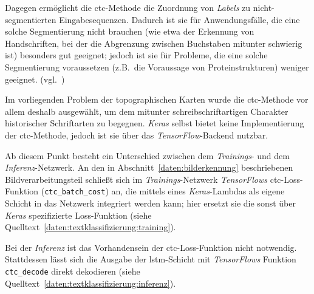 Dagegen ermöglicht die \gls{ctc}-Methode die Zuordnung von \textit{Labels} zu nicht-segmentierten Eingabesequenzen.
Dadurch ist sie für Anwendungsfälle, die eine solche Segmentierung nicht brauchen (wie etwa der Erkennung von
Handschriften, bei der die Abgrenzung zwischen Buchstaben mitunter schwierig ist) besonders gut geeignet; jedoch ist sie
für Probleme, die eine solche Segmentierung voraussetzen (z.B.\ die Voraussage von Proteinstrukturen) weniger geeignet.
(vgl.~\cite{graves2006})

Im vorliegenden Problem der topographischen Karten wurde die \gls{ctc}-Methode vor allem deshalb ausgewählt, um dem
mitunter schreibschriftartigen Charakter historischer Schriftarten zu begegnen. \textit{Keras} selbst bietet keine
Implementierung der \gls{ctc}-Methode, jedoch ist sie über das \textit{TensorFlow}-Backend nutzbar.

Ab diesem Punkt besteht ein Unterschied zwischen dem \textit{Trainings}- und dem \textit{Inferenz}-Netzwerk. An den
in Abschnitt~\ref{daten:bilderkennung} beschriebenen Bildverarbeitungsteil schließt sich im \textit{Trainings}-Netzwerk
\textit{TensorFlows} \gls{ctc}-Loss-Funktion (\texttt{ctc\_batch\_cost}) an, die mittels eines \textit{Keras}-Lambdas
als eigene Schicht in das Netzwerk integriert werden kann; hier ersetzt sie die sonst über \textit{Keras} spezifizierte
Loss-Funktion (siehe Quelltext~\ref{daten:textklassifizierung:training}).

Bei der \textit{Inferenz} ist das Vorhandensein der \gls{ctc}-Loss-Funktion nicht notwendig. Stattdessen lässt sich die
Ausgabe der \gls{lstm}-Schicht mit \textit{TensorFlows} Funktion \texttt{ctc\_decode} direkt dekodieren (siehe
Quelltext~\ref{daten:textklassifizierung:inferenz}).

